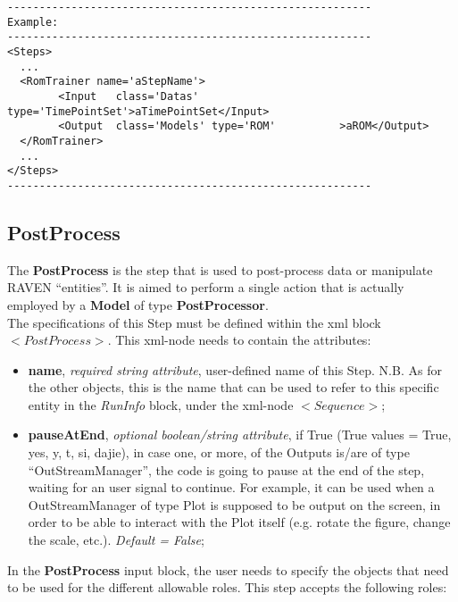 \begin{lstlisting}[style=XML]
---------------------------------------------------------
Example:
---------------------------------------------------------
<Steps>
  ...
  <RomTrainer name='aStepName'>
        <Input   class='Datas'  type='TimePointSet'>aTimePointSet</Input>
        <Output  class='Models' type='ROM'          >aROM</Output>
  </RomTrainer>
  ...
</Steps>
---------------------------------------------------------
\end{lstlisting}
\subsection{PostProcess}
\label{subsec:stepPostProcess}
The \textbf{PostProcess} is the step that is used to post-process data or manipulate RAVEN ``entities''. It is aimed to perform a single action that is actually employed by a \textbf{Model} of type \textbf{PostProcessor}.
\\ The specifications of this Step must be defined within the xml block $<PostProcess>$. This xml-node needs to contain the attributes:
\vspace{-5mm}
\begin{itemize}
\itemsep0em
\item \textbf{name}, \textit{required string attribute}, user-defined name of this Step. N.B. As for the other objects, this is the name that can be used to refer to this specific entity in the \textit{RunInfo} block, under the xml-node $<Sequence>$;
\item \textbf{pauseAtEnd}, \textit{optional boolean/string attribute}, if True (True values = True, yes, y, t, si, dajie), in case one, or more, of the Outputs is/are of type ``OutStreamManager'', the code is going to pause at the end of the step, waiting for an user signal to continue. For example, it can be used when a OutStreamManager of type Plot is supposed to be output on the screen, in order to be able to interact with the Plot itself (e.g. rotate the figure, change the scale, etc.).  \textit{Default = False};
\end{itemize}
\vspace{-5mm}
In the \textbf{PostProcess} input block, the user needs to specify the objects that need to be used for the different allowable roles. This step accepts the following roles:
